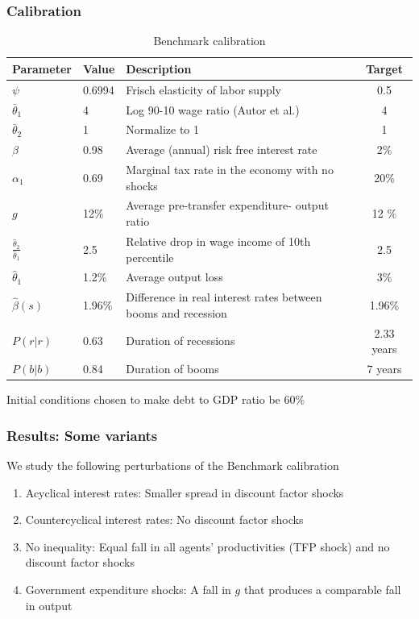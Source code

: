 \documentclass{beamer}
\begin{document}
\begin{frame}
 \frametitle{Calibration}

{\tiny
\begin{table}[htp]
{\tiny
\begin{tabular}{|l|l|l|c|}
\hline
Parameter & Value & Description &Target   \\ \hline
$\psi$ & 0.6994 &Frisch elasticity of labor supply & 0.5   \\
$\bar{\theta}_1 $ & 4& Log 90-10 wage ratio (Autor et al.) & 4   \\
$\bar{\theta}_2 $ & 1 &Normalize to 1 & 1  \\
$\beta$ & 0.98  &Average (annual) risk free interest rate & 2\%   \\
$\alpha_1$ & 0.69 & Marginal tax rate in the economy with no shocks & 20\% \\
$g$ & 12\%&Average pre-transfer expenditure- output ratio & 12 \% \\
$\frac{\hat {\theta}_2}{\hat {\theta}_1}$ & 2.5 & Relative drop in wage income of 10th
percentile & 2.5\\
$\hat{\theta}_1$ & 1.2\% & Average output loss& 3\% \\
$\hat{\beta}(s)$ & 1.96\%& Difference in real interest rates between booms and recession& 1.96\% \\
$P(r|r)$ & 0.63&Duration of recessions & 2.33 years \\
$P(b|b)$ & 0.84 &Duration of booms &7 years \\ \hline
\end{tabular}
}
\caption{Benchmark calibration}
\label{tab:Parameters}
\end{table}
}
Initial conditions chosen to make  debt to GDP ratio be 60\%
 \end{frame}

\begin{frame}
 \frametitle{Results: Some variants }
 We study the following perturbations of the Benchmark calibration 
 \begin{enumerate}
\item Acyclical interest rates: Smaller spread in discount factor shocks
\item Countercyclical interest rates: No discount factor shocks
\item No inequality: Equal fall in all agents' productivities (TFP shock) and no discount factor shocks
\item Government expenditure shocks: A fall in $g$ that produces a comparable fall in output
\end{enumerate}

 \end{frame}
\end{document}
